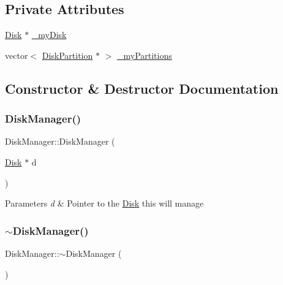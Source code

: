 \subsection*{Private Attributes}
\begin{DoxyCompactItemize}
\item 
\mbox{\hyperlink{class_disk}{Disk}} $\ast$ \mbox{\hyperlink{class_disk_manager_a2f342673f450be650f1b08650b6b6e40}{\+\_\+my\+Disk}}
\item 
vector$<$ \mbox{\hyperlink{struct_disk_partition}{Disk\+Partition}} $\ast$ $>$ \mbox{\hyperlink{class_disk_manager_ae509fd85f802b1dcab2368a146b17ae7}{\+\_\+my\+Partitions}}
\end{DoxyCompactItemize}


\subsection{Constructor \& Destructor Documentation}
\mbox{\label{class_disk_manager_a948cecec230d9895bafaced5534fd6cf}} 
\subsubsection{\texorpdfstring{Disk\+Manager()}{DiskManager()}}
{\footnotesize\ttfamily Disk\+Manager\+::\+Disk\+Manager (\begin{DoxyParamCaption}\item[{\mbox{\hyperlink{class_disk}{Disk}} $\ast$}]{d }\end{DoxyParamCaption})}


\begin{DoxyParams}{Parameters}
{\em d} & Pointer to the \mbox{\hyperlink{class_disk}{Disk}} this will manage \\
\hline
\end{DoxyParams}
\mbox{\label{class_disk_manager_a60837a3b8064649adf23e3143c85aed7}} 
\subsubsection{\texorpdfstring{$\sim$\+Disk\+Manager()}{~DiskManager()}}
{\footnotesize\ttfamily Disk\+Manager\+::$\sim$\+Disk\+Manager (\begin{DoxyParamCaption}{ }\end{DoxyParamCaption})}



